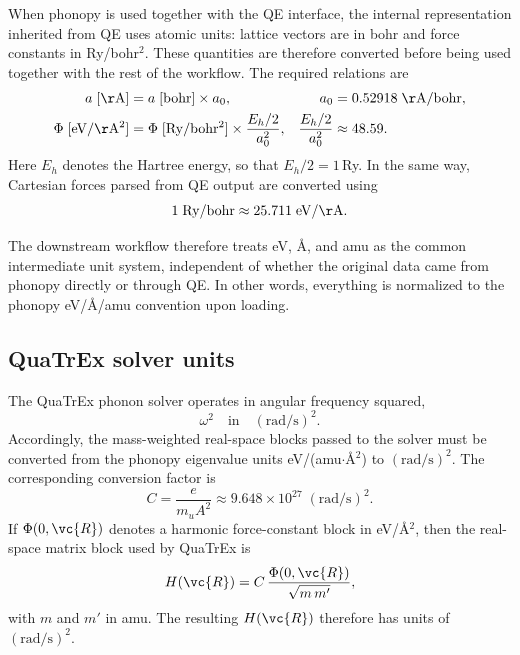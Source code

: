 When phonopy is used together with the QE interface, the internal
representation inherited from QE uses atomic units: lattice vectors are
in bohr and force constants in Ry/bohr$^2$.  These quantities are
therefore converted before being used together with the rest of the
workflow.  The required relations are
\begin{align}
  a\;[\mathrm{\AA}]
    &= a\;[\mathrm{bohr}] \times a_0,
    & a_0 &= 0.52918\;\mathrm{\AA/bohr}, \\
  \Phi\;[\mathrm{eV/\AA^2}]
    &= \Phi\;[\mathrm{Ry/bohr^2}] \times \frac{E_h/2}{a_0^2},
    & \frac{E_h/2}{a_0^2} &\approx 48.59.
\end{align}
Here $E_h$ denotes the Hartree energy, so that $E_h/2 = 1$\,Ry.  In the
same way, Cartesian forces parsed from QE output are converted using
\begin{equation}
  1\;\mathrm{Ry/bohr} \approx 25.711\;\mathrm{eV/\AA}.
\end{equation}

The downstream workflow therefore treats eV, \AA, and amu as the common
intermediate unit system, independent of whether the original data came
from phonopy directly or through QE.  In other words, everything is
normalized to the phonopy eV/\AA/amu convention upon loading.

\subsection{QuaTrEx solver units}
\label{sec:solver_units}

The QuaTrEx phonon solver operates in angular frequency squared,
\begin{equation}
  \omega^2 \quad \text{in} \quad (\mathrm{rad/s})^2.
\end{equation}
Accordingly, the mass-weighted real-space blocks passed to the solver
must be converted from the phonopy eigenvalue units
eV/(amu$\cdot$\AA$^2$) to $(\mathrm{rad/s})^2$.  The corresponding
conversion factor is
\begin{equation}\label{eq:conversion}
  C = \frac{e}{m_u A^2}
  \approx 9.648 \times 10^{27}\;\mathrm{(rad/s)^2}.
\end{equation}
If $\Phi(0,\vc{R})$ denotes a harmonic force-constant block in
eV/\AA$^2$, then the real-space matrix block used by QuaTrEx is
\begin{equation}
  H(\vc{R})
  = C\,
    \frac{\Phi(0,\vc{R})}{\sqrt{m\,m'}},
\end{equation}
with $m$ and $m'$ in amu.  The resulting $H(\vc{R})$ therefore has units
of $(\mathrm{rad/s})^2$.

